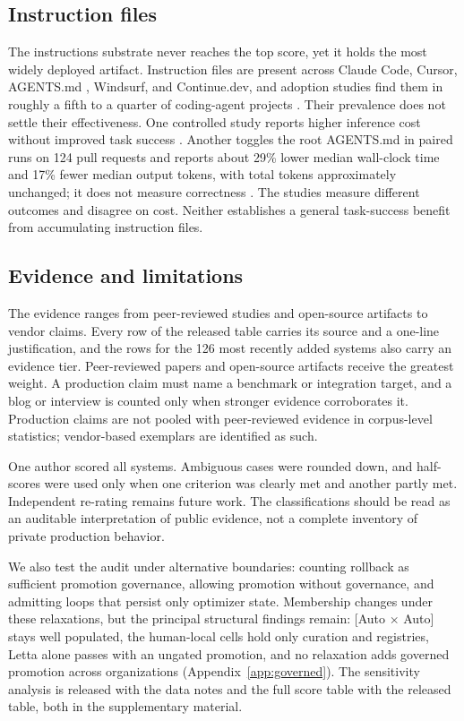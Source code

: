 \subsection{Instruction files}\label{instruction-files}

The instructions substrate never reaches the top score, yet it holds the most widely deployed artifact. Instruction files are present across Claude Code, Cursor, AGENTS.md \citep{agentsmd2025}, Windsurf, and Continue.dev, and adoption studies find them in roughly a fifth to a quarter of coding-agent projects \citep{robbes2026agenticmuch, galster2026harnessconfig}. Their prevalence does not settle their effectiveness. One controlled study reports higher inference cost without improved task success \citep{gloaguen2026agentsmd}. Another toggles the root AGENTS.md in paired runs on 124 pull requests and reports about 29\% lower median wall-clock time and 17\% fewer median output tokens, with total tokens approximately unchanged; it does not measure correctness \citep{lulla2026empirical}. The studies measure different outcomes and disagree on cost. Neither establishes a general task-success benefit from accumulating instruction files.

\subsection{Evidence and limitations}\label{evidence-and-limitations}

The evidence ranges from peer-reviewed studies and open-source artifacts to vendor claims. Every row of the released table carries its source and a one-line justification, and the rows for the 126 most recently added systems also carry an evidence tier. Peer-reviewed papers and open-source artifacts receive the greatest weight. A production claim must name a benchmark or integration target, and a blog or interview is counted only when stronger evidence corroborates it. Production claims are not pooled with peer-reviewed evidence in corpus-level statistics; vendor-based exemplars are identified as such.

One author scored all systems. Ambiguous cases were rounded down, and half-scores were used only when one criterion was clearly met and another partly met. Independent re-rating remains future work. The classifications should be read as an auditable interpretation of public evidence, not a complete inventory of private production behavior.

We also test the audit under alternative boundaries: counting rollback as sufficient promotion governance, allowing promotion without governance, and admitting loops that persist only optimizer state. Membership changes under these relaxations, but the principal structural findings remain: {[}Auto \(\times\) Auto{]} stays well populated, the human-local cells hold only curation and registries, Letta alone passes with an ungated promotion, and no relaxation adds governed promotion across organizations (Appendix~\ref{app:governed}). The sensitivity analysis is released with the data notes and the full score table with the released table, both in the supplementary material.

